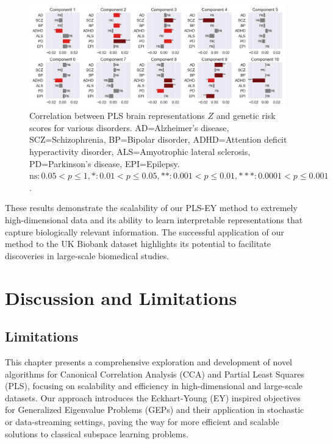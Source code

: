\begin{figure}
\centering
\includegraphics[width=0.99\textwidth,trim={0.5cm 0cm 0.7cm 0cm}]{figures/UKBB/prs_correlations.png}
\caption{Correlation between PLS brain representations $Z$ and genetic risk scores for various disorders. AD=Alzheimer's disease, SCZ=Schizophrenia, BP=Bipolar disorder, ADHD=Attention deficit hyperactivity disorder, ALS=Amyotrophic lateral sclerosis, PD=Parkinson's disease, EPI=Epilepsy. $\text{ns}: 0.05 < p \leq 1, \ast: 0.01 < p \leq 0.05, \ast\ast: 0.001 < p \leq 0.01, \ast\ast\ast: 0.0001 < p \leq 0.001$.}
\label{fig:genetic_risk}
\end{figure}
These results demonstrate the scalability of our PLS-EY method to extremely high-dimensional data and its ability to learn interpretable representations that capture biologically relevant information. The successful application of our method to the UK Biobank dataset highlights its potential to facilitate discoveries in large-scale biomedical studies.

\section{Discussion and Limitations}\label{sec:discussion}

\subsection{Limitations}

This chapter presents a comprehensive exploration and development of novel algorithms for Canonical Correlation Analysis (CCA) and Partial Least Squares (PLS), focusing on scalability and efficiency in high-dimensional and large-scale datasets.
Our approach introduces the Eckhart-Young (EY) inspired objectives for Generalized Eigenvalue Problems (GEPs) and their application in stochastic or data-streaming settings, paving the way for more efficient and scalable solutions to classical subspace learning problems.

